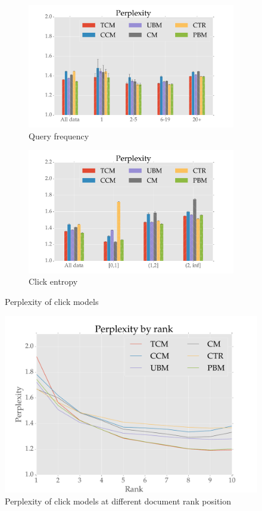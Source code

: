 \begin{figure}
	\centering
	\begin{subfigure}[b]{.49\textwidth}
		\centering
		\includegraphics[width=\textwidth]{figures/Perp_qf.pdf}
		\caption{Query frequency}
		\label{fig:perp_qf}
	\end{subfigure}
	\begin{subfigure}[b]{.49\textwidth}
		\centering
		\includegraphics[width=\textwidth]{figures/Perp_ce.pdf}
		\caption{Click entropy}
		\label{fig:perp_ce}
	\end{subfigure}
	\caption{Perplexity of click models}
	\label{fig:perp}
\end{figure}

\begin{figure}
	\centering
	\includegraphics[width=.8\textwidth]{figures/Perp_rank.pdf}
	\caption{Perplexity of click models at different document rank position}
	\label{fig:perp_rank}
\end{figure}


